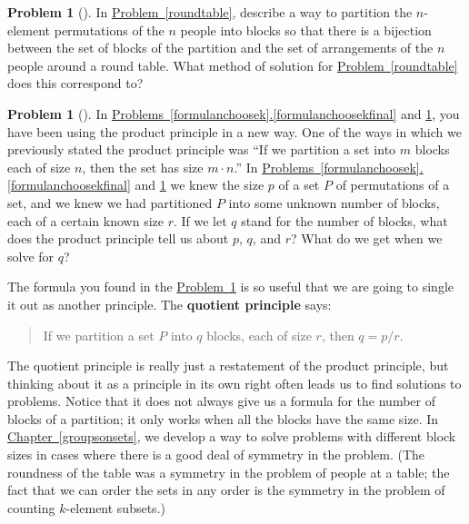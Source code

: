 \documentclass[10pt,]{book}
\newcommand{\terminology}[1]{\textbf{#1}}
\theoremstyle{plain}
\theoremstyle{definition}
\newtheorem{activity}[project]{Problem}
\theoremstyle{definition}
\numberwithin{equation}{chapter}
\begin{document}
\begin{activity}[] \label{roundtablepartition}
\hypertarget{p-243}{}%
In \hyperref[roundtable]{Problem~\ref{roundtable}}, describe a way to partition the \(n\)-element permutations of the \(n\) people into blocks so that there is a bijection between the set of blocks of the partition and the set of arrangements of the \(n\) people around a round table. What method of solution for \hyperref[roundtable]{Problem~\ref{roundtable}} does this correspond to?%
\end{activity}
\begin{activity}[] \label{quotientprinciple}
\hypertarget{p-245}{}%
In \hyperref[formulanchoosekfinal]{Problems~\ref{formulanchoosek}.\ref{formulanchoosekfinal}} and \hyperref[roundtablepartition]{\ref{roundtablepartition}}, you have been using the product principle in a new way. One of the ways in which we previously stated the product principle was ``If we partition a set into \(m\) blocks each of size \(n\), then the set has size \(m\cdot n\).'' In \hyperref[formulanchoosekfinal]{Problems~\ref{formulanchoosek}.\ref{formulanchoosekfinal}} and \hyperref[roundtablepartition]{\ref{roundtablepartition}} we knew the size \(p\) of a set \(P\) of permutations of a set, and we knew we had partitioned \(P\) into some unknown number of blocks, each of a certain known size \(r\). If we let \(q\) stand for the number of blocks, what does the product principle tell us about \(p\), \(q\), and \(r\)? What do we get when we solve for \(q\)?%
\end{activity}
\hypertarget{p-247}{}%
The formula you found in the \hyperref[quotientprinciple]{Problem~\ref{quotientprinciple}} is so useful that we are going to single it out as another principle. The \terminology{quotient principle} says:%
\begin{quote}\hypertarget{blockquote-6}{}
\hypertarget{p-248}{}%
If we partition a set \(P\) into \(q\) blocks, each of size \(r\), then \(q=p/r.\)%
\end{quote}
\hypertarget{p-249}{}%
The quotient principle is really just a restatement of the product principle, but thinking about it as a principle in its own right often leads us to find solutions to problems. Notice that it does not always give us a formula for the number of blocks of a partition; it only works when all the blocks have the same size. In \hyperref[groupsonsets]{Chapter~\ref{groupsonsets}}, we develop a way to solve problems with different block sizes in cases where there is a good deal of symmetry in the problem. (The roundness of the table was a symmetry in the problem of people at a table; the fact that we can order the sets in any order is the symmetry in the problem of counting \(k\)-element subsets.)%
\end{document}
